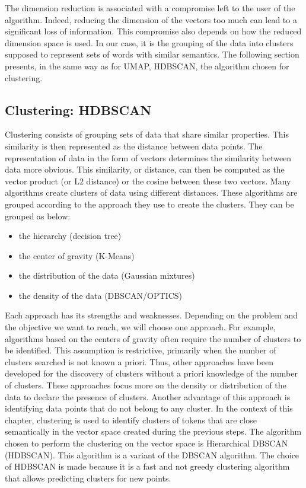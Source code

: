 The dimension reduction is associated with a compromise left to the user of the algorithm.
Indeed, reducing the dimension of the vectors too much can lead to a significant loss of information.
This compromise also depends on how the reduced dimension space is used.
In our case, it is the grouping of the data into clusters supposed to represent sets of words with similar semantics.
The following section presents, in the same way as for UMAP, HDBSCAN, the algorithm chosen for clustering.

\subsection{Clustering: HDBSCAN}
Clustering consists of grouping sets of data that share similar properties.
This similarity is then represented as the distance between data points.
The representation of data in the form of vectors determines the similarity between data more obvious.
This similarity, or distance, can then be computed as the vector product (or L2 distance) or the cosine between these two vectors.
Many algorithms create clusters of data using different distances.
These algorithms are grouped according to the approach they use to create the clusters.
They can be grouped as below:

\begin{itemize}
    \item the hierarchy (decision tree)
    \item the center of gravity (K-Means)
    \item the distribution of the data (Gaussian mixtures)
    \item the density of the data (DBSCAN/OPTICS)
\end{itemize}

Each approach has its strengths and weaknesses.
Depending on the problem and the objective we want to reach, we will choose one approach.
For example, algorithms based on the centers of gravity often require the number of clusters to be identified.
This assumption is restrictive, primarily when the number of clusters searched is not known a priori.
Thus, other approaches have been developed for the discovery of clusters without a priori knowledge of the number of clusters.
These approaches focus more on the density or distribution of the data to declare the presence of clusters.
Another advantage of this approach is identifying data points that do not belong to any cluster.
In the context of this chapter, clustering is used to identify clusters of tokens that
are close semantically in the vector space created during the previous steps.
The algorithm chosen to perform the clustering on the vector space is Hierarchical DBSCAN (HDBSCAN).
This algorithm is a variant of the DBSCAN algorithm.
The choice of HDBSCAN is made because it is a fast and not greedy clustering algorithm that allows predicting clusters for new points.

